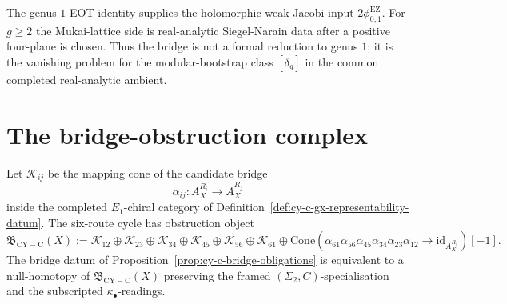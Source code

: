 \begin{remark}
\label{rem:prop-cy-c-i2-reduction-triple}
The genus-\(1\) \textup{EOT} identity supplies the holomorphic
weak-Jacobi input \(2\phi_{0,1}^{\mathrm{EZ}}\).  For \(g\geq2\) the
Mukai-lattice side is real-analytic Siegel-Narain data after a
positive four-plane is chosen.  Thus the bridge is not a formal
reduction to genus \(1\); it is the vanishing problem for the
modular-bootstrap class \([\delta_g]\) in the common completed
real-analytic ambient.
\end{remark}

\section{The bridge-obstruction complex}
\label{sec:cy-c-bridge-obstruction-complex}

Let
\(\mathcal K_{ij}\) be the mapping cone of the candidate bridge
\[
 \alpha_{ij}\colon A_X^{R_i}\longrightarrow A_X^{R_j}
\]
inside the completed \(E_1\)-chiral category of
Definition~\ref{def:cy-c-gx-representability-datum}. The six-route
cycle has obstruction object
\[
 \mathfrak B_{\mathrm{CY-C}}(X)
 :=
 \mathcal K_{12}\oplus\mathcal K_{23}\oplus\mathcal K_{34}
 \oplus\mathcal K_{45}\oplus\mathcal K_{56}\oplus\mathcal K_{61}
 \oplus
 \mathrm{Cone}\!\left(
 \alpha_{61}\alpha_{56}\alpha_{45}\alpha_{34}\alpha_{23}\alpha_{12}
 \to \mathrm{id}_{A_X^{R_1}}
 \right)[-1].
\]
The bridge datum of Proposition~\ref{prop:cy-c-bridge-obligations} is
equivalent to a null-homotopy of
\(\mathfrak B_{\mathrm{CY-C}}(X)\) preserving the framed
\((\Sigma_2,C)\)-specialisation and the subscripted
\(\kappa_\bullet\)-readings.

